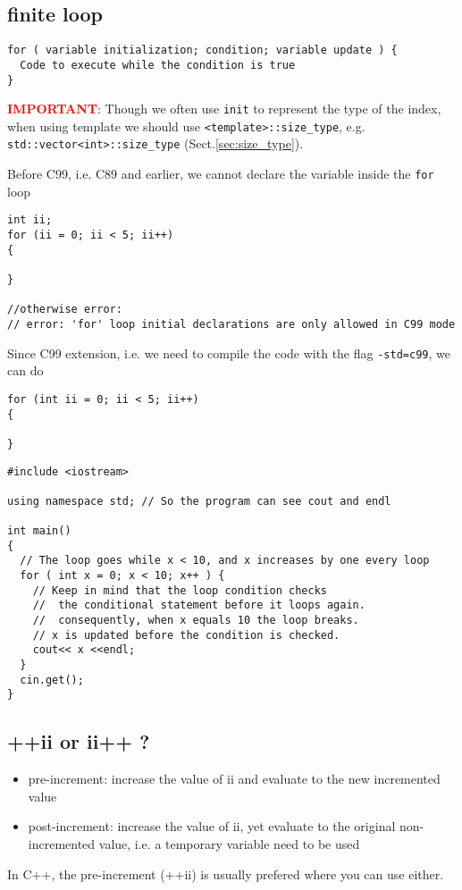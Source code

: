 \subsection{finite loop}

{\small \begin{verbatim} 
for ( variable initialization; condition; variable update ) {
  Code to execute while the condition is true
}
\end{verbatim}}

\textcolor{red}{\bf IMPORTANT}: Though we often use \verb!init! to represent the
type of the index, when using template we should use \verb!<template>::size_type!, e.g.
\verb!std::vector<int>::size_type! (Sect.\ref{sec:size_type}).


Before C99, i.e. C89 and earlier, we cannot declare the variable inside the
\verb!for! loop
\begin{verbatim}
int ii; 
for (ii = 0; ii < 5; ii++)
{

}

//otherwise error:
// error: 'for' loop initial declarations are only allowed in C99 mode
\end{verbatim}

Since C99 extension, i.e. we need to compile the code with the flag
\verb!-std=c99!, we can do
\begin{verbatim}
for (int ii = 0; ii < 5; ii++)
{

}
\end{verbatim}

\begin{verbatim}
#include <iostream>

using namespace std; // So the program can see cout and endl

int main()
{
  // The loop goes while x < 10, and x increases by one every loop
  for ( int x = 0; x < 10; x++ ) {
    // Keep in mind that the loop condition checks 
    //  the conditional statement before it loops again.
    //  consequently, when x equals 10 the loop breaks.
    // x is updated before the condition is checked.    
    cout<< x <<endl;
  }
  cin.get();
}
\end{verbatim}





\subsection{++ii or ii++ ?}

\begin{itemize}
  \item pre-increment: increase the value of ii and evaluate to the new
  incremented value
  
  \item post-increment: increase the value of ii, yet evaluate to the
  original non-incremented value, i.e. a temporary variable need to be used
\end{itemize}
In C++, the pre-increment (++ii) is usually prefered where you can use either.


